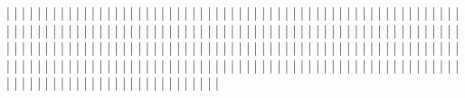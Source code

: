 |                   |
|                   |
|                   |
|                   |
|                   |
|                   |
|                   |
|                   |
|                   |
|                   |
|                   |
|                   |
|                   |
|                   |
|                   |
|                   |
|                   |
|                   |
|                   |
|                   |
|                   |
|                   |
|                   |
|                   |
|                   |
|                   |
|                   |
|                   |
|                   |
|                   |
|                   |
|                   |
|                   |
|                   |
|                   |
|                   |
|                   |
|                   |
|                   |
|                   |
|                   |
|                   |
|                   |
|                   |
|                   |
|                   |
|                   |
|                   |
|                   |
|                   |
|                   |
|                   |
|                   |
|                   |
|                   |
|                   |
|                   |
|                   |
|                   |
|                   |
|                   |
|                   |
|                   |
|                   |
|                   |
|                   |
|                   |
|                   |
|                   |
|                   |
|                   |
|                   |
|                   |
|                   |
|                   |
|                   |
|                   |
|                   |
|                   |
|                   |
|                   |
|                   |
|                   |
|                   |
|                   |
|                   |
|                   |
|                   |
|                   |
|                   |
|                   |
|                   |
|                   |
|                   |
|                   |
|                   |
|                   |
|                   |
|                   |
|                   |
|                   |
|                   |
|                   |
|                   |
|                   |
|                   |
|                   |
|                   |
|                   |
|                   |
|                   |
|                   |
|                   |
|                   |
|                   |
|                   |
|                   |
|                   |
|                   |
|                   |
|                   |
|                   |
|                   |
|                   |
|                   |
|                   |
|                   |
|                   |
|                   |
|                   |
|                   |
|                   |